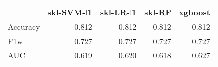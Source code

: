 \begin{tabular}{lrrrr}
\toprule
{} &  skl-SVM-l1 &  skl-LR-l1 &  skl-RF &  xgboost \\
\midrule
Accuracy &       0.812 &      0.812 &   0.812 &    0.812 \\
F1w      &       0.727 &      0.727 &   0.727 &    0.727 \\
AUC      &       0.619 &      0.620 &   0.618 &    0.627 \\
\bottomrule
\end{tabular}
